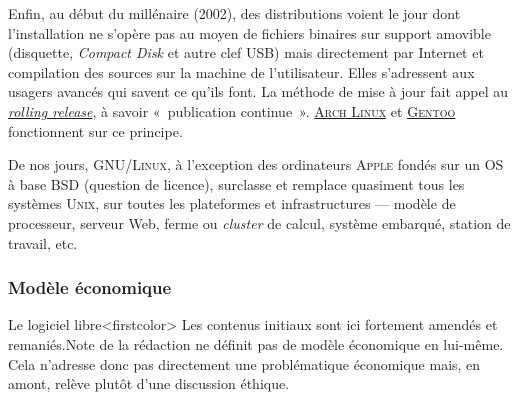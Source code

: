 Enfin, au début du millénaire (2002), des distributions voient le jour dont l'installation ne s'opère pas au moyen de fichiers binaires sur support amovible (disquette, \textit{Compact Disk} et autre clef USB) mais directement par Internet et compilation des sources sur la machine de l'utilisateur. Elles s'adressent aux usagers avancés qui savent ce qu'ils font. La méthode de mise à jour fait appel au \href{https://fr.wikipedia.org/wiki/Rolling_release}{\textit{rolling release}}, à savoir «~publication continue~». \href{https://archlinux.fr/}{\textsc{Arch Linux}} et \href{https://www.gentoo.org/}{\textsc{Gentoo}} fonctionnent sur ce principe.

De nos jours, \textsc{GNU/Linux}, à l'exception des ordinateurs \textsc{Apple} fondés sur un OS à base BSD (question de licence),  surclasse et remplace quasiment tous les systèmes \textsc{Unix}, sur toutes les plateformes et infrastructures --- modèle de processeur, serveur Web, ferme ou \textit{cluster} de calcul, système embarqué, station de travail, etc.


\subsubsection[Modèle économique]{Modèle économique}
\label{subsub:I.4.3.2}

Le logiciel libre\caution[t]<firstcolor>{%
Les contenus initiaux sont ici fortement amendés et remaniés.}{Note de la rédaction}
ne définit pas de modèle économique en lui-même. Cela n'adresse donc pas directement une problématique économique mais, en amont, relève plutôt d'une discussion éthique. 

